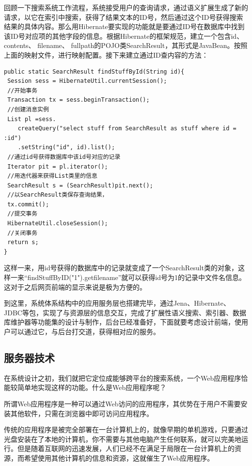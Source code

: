 \documentclass[12pt,a4paper]{article}
\begin{document}
	回顾一下搜索系统工作流程，系统接受用户的查询请求，通过语义扩展生成了新的请求，以它在索引中搜索，获得了结果文本的ID号，然后通过这个ID号获得搜索结果的具体内容。那么用Hibernate要实现的功能就是要通过ID号在数据库中找到该ID号对应项的其他字段的信息。根据Hibernate的框架规范，建立一个包含id、 contents、 filename、 fullpath的POJO类SearchResult，其形式是JavaBean。按照上面的映射文件，进行映射配置。接下来建立通过ID查内容的方法：
	
\lstset{language=Java,frame=lines}
\begin{lstlisting}
public static SearchResult findStuffById(String id){
 Session sess = HibernateUtil.currentSession();
 //开始事务
 Transaction tx = sess.beginTransaction();
 //创建消息实例
 List pl =sess.
 	createQuery("select stuff from SearchResult as stuff where id = :id")
 	.setString("id", id).list();
 //通过id号获得数据库中该id号对应的记录
 Iterator pit = pl.iterator();
 //用迭代器来获得List类里的信息
 SearchResult s = (SearchResult)pit.next();
 //以SearchResult类保存查询结果，
 tx.commit();
 //提交事务
 HibernateUtil.closeSession();
 //关闭事务
 return s;
}
\end{lstlisting}	

	这样一来，用id号获得的数据库中的记录就变成了一个SearchResult类的对象，这样一来“findStuffByID("1").getfilename”就可以获得id号为1的记录中文件名信息。这对于之后网页前端的显示来说是极为方便的。
	
	到这里，系统体系结构中的应用服务层也搭建完毕，通过Jena、Hibernate、JDBC等包，实现了与资源层的信息交互，完成了扩展性语义搜索、索引器、数据库维护器等功能集的设计与制作，后台已经准备好，下面就要考虑设计前端，使用户可以通过它，与后台打交道，获得相对应的服务。

	\subsection{服务器技术}
	
	在系统设计之初，我们就把它定位成能够跨平台的搜索系统，一个Web应用程序恰能较简单地实现这样的功能。什么是Web应用程序呢？
	
	所谓Web应用程序是一种可以通过Web访问的应用程序，其优势在于用户不需要安装其他软件，只需在浏览器中即可访问应用程序。
	
	传统的应用程序是被完全部署在一台计算机上的，就像早期的单机游戏，只要通过光盘安装在了本地的计算机，你不需要与其他电脑产生任何联系，就可以完美地运行。但是随着互联网的迅速发展，人们已经不在满足于局限在一台计算机上的资源，而希望使用其他计算机的信息和资源，这就催生了Web应用程序。
	
\end{document}
